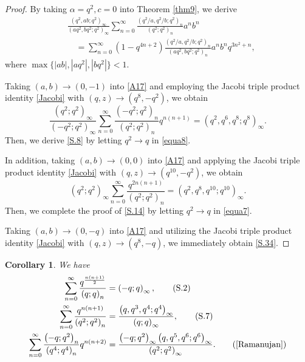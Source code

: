 \documentclass[reqno,12pt]{amsart}
\newtheorem{corollary}[theorem]{Corollary}
\theoremstyle{remark}
\numberwithin{equation}{section}
\begin{document}
\begin{proof}
By taking $\alpha=q^2,c=0$ into Theorem \ref{thm9}, we derive 
\begin{align}
&\frac{\left(q^2,ab;q^2\right)_{\infty}}
{\left(aq^2,bq^2;q^2\right)_{\infty}}\sum_{n=0}^{\infty}
\frac{\left(q^2/a,q^2/b;q^2\right)_{n}}
{\left(q^2;q^2\right)_{n}}a^nb^n\nonumber\\
&\quad=\sum_{n=0}^{\infty}\left(1-q^{4n+2}\right)
\frac{\left(q^2/a,q^2/b;q^2\right)_{n}}
{\left(aq^2,bq^2;q^2\right)_n}
a^nb^nq^{3n^2+n},\label{A17}
\end{align}
where $\max\{|ab|,|aq^2|,|bq^2|\}<1$.

Taking $\left(a,b\right)\to\left(0,-1\right)$ into \eqref{A17} and employing the Jacobi triple product identity \eqref{Jacobi} with $\left(q,z\right)\to\left(q^8,-q^2\right)$, we obtain
\begin{equation}\label{equa8}
\frac{\left(q^2;q^2\right)_{\infty}}{\left(-q^2;q^2\right)_{\infty}}
\sum_{n=0}^{\infty}\frac{\left(-q^2;q^2\right)_{n}}{\left(q^2;q^2\right)_{n}}
q^{n\left(n+1\right)}
=\left(q^2,q^6,q^8;q^8\right)_{\infty}.
\end{equation}
Then, we derive \eqref{S.8} by letting $q^2\to q$ in \eqref{equa8}.

In addition, taking $\left(a,b\right)\to\left(0,0\right)$ into  \eqref{A17} and applying the Jacobi triple product identity \eqref{Jacobi} with $\left(q,z\right)\to\left(q^{10},-q^2\right)$, we obtain
\begin{equation}\label{equa7}
\left(q^2;q^2\right)_{\infty}
\sum_{n=0}^{\infty}\frac{q^{2n\left(n+1\right)}}{\left(q^2;q^2\right)_{n}}
=\left(q^2,q^8,q^{10};q^{10}\right)_{\infty}.
\end{equation}
Then, we complete the proof of \eqref{S.14} by letting $q^2\to q$ in \eqref{equa7}.

Taking $\left(a,b\right)\to\left(0,-q\right)$ into \eqref{A17} and utilizing the Jacobi triple product identity \eqref{Jacobi} with $\left(q,z\right)\to\left(q^8,-q\right)$, we immediately obtain \eqref{S.34}.
\end{proof}
\begin{corollary}
We have
\begin{align}
\sum_{n=0}^{\infty}\frac{q^{\frac{n\left(n+1\right)}{2}}}
{\left(q;q\right)_{n}}
&=\left(-q;q\right)_{\infty},\tag{S.2}\label{S.2}\\
\sum_{n=0}^{\infty}\frac{
q^{n\left(n+1\right)}}{\left(q^2;q^2\right)_n}
&=
\frac{\left(q,q^3,q^4;q^4\right)_{\infty}}
{\left(q;q\right)_{\infty}},\tag{S.7}\label{S.7}
\\
\sum_{n=0}^{\infty}\frac{\left(-q;q^2\right)_n}
{\left(q^4;q^4\right)_n}q^{n\left(n+2\right)}
&=\frac{\left(-q;q^2\right)_{\infty}\left(q,q^5,q^6;q^6\right)_{\infty}}
{\left(q^2;q^2\right)_{\infty}}.\tag{\cite[Entry 5.3.7]{Ramanujan}}\label{new2}
\end{align}
\end{corollary}
\end{document}
